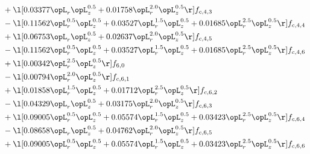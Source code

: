 \begin{alignat}{2}
& + \l[  0.03377 \opL_r \opL_z^{0.5} +  0.01758 \opL_r^{2.0} \opL_z^{0.5}  \r] f_{c,4,3} \nonumber \\ 
& - \l[  0.11562 \opL_r^{0.5} \opL_z^{0.5} +  0.03527 \opL_r^{1.5} \opL_z^{0.5} +  0.01685 \opL_r^{2.5} \opL_z^{0.5}  \r] f_{c,4,4} \nonumber \\ 
& + \l[  0.06753 \opL_r \opL_z^{0.5} +  0.02637 \opL_r^{2.0} \opL_z^{0.5}  \r] f_{c,4,5} \nonumber \\ 
& - \l[  0.11562 \opL_r^{0.5} \opL_z^{0.5} +  0.03527 \opL_r^{1.5} \opL_z^{0.5} +  0.01685 \opL_r^{2.5} \opL_z^{0.5}  \r] f_{c,4,6} \nonumber \\ 
& + \l[  0.00342 \opL_r^{2.5} \opL_z^{0.5}  \r] f_{6,0} \nonumber \\ 
& - \l[  0.00794 \opL_r^{2.0} \opL_z^{0.5}  \r] f_{c,6,1} \nonumber \\ 
& + \l[  0.01858 \opL_r^{1.5} \opL_z^{0.5} +  0.01712 \opL_r^{2.5} \opL_z^{0.5}  \r] f_{c,6,2} \nonumber \\ 
& - \l[  0.04329 \opL_r \opL_z^{0.5} +  0.03175 \opL_r^{2.0} \opL_z^{0.5}  \r] f_{c,6,3} \nonumber \\ 
& + \l[  0.09005 \opL_r^{0.5} \opL_z^{0.5} +  0.05574 \opL_r^{1.5} \opL_z^{0.5} +  0.03423 \opL_r^{2.5} \opL_z^{0.5}  \r] f_{c,6,4} \nonumber \\ 
& - \l[  0.08658 \opL_r \opL_z^{0.5} +  0.04762 \opL_r^{2.0} \opL_z^{0.5}  \r] f_{c,6,5} \nonumber \\ 
& + \l[  0.09005 \opL_r^{0.5} \opL_z^{0.5} +  0.05574 \opL_r^{1.5} \opL_z^{0.5} +  0.03423 \opL_r^{2.5} \opL_z^{0.5}  \r] f_{c,6,6} \nonumber \\ 
\end{alignat} 


